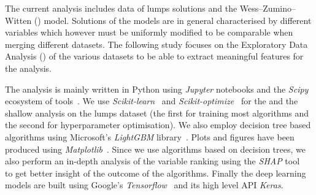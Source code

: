 The current analysis includes data of lumps solutions and the Wess--Zumino--Witten (\wzw)  model.
Solutions of the models are in general characterised by different variables which however must be uniformly modified to be comparable when merging different datasets.
The following study focuses on the Exploratory Data Analysis (\eda) of the various datasets to be able to extract meaningful features for the \ml analysis.

The analysis is mainly written in Python using \emph{Jupyter} notebooks and the \emph{Scipy} ecosystem of tools~\Cite{Virtanen:2020:SciPyFundamentalAlgorithms}.
We use \emph{Scikit-learn}~\Cite{Pedregosa:2011:ScikitlearnMachineLearning} and \emph{Scikit-optimize}~\Cite{Head:2018:ScikitoptimizeScikitoptimizeV0} for the \eda and the shallow \ml analysis on the lumps dataset (the first for training most algorithms and the second for hyperparameter optimisation).
We also employ decision tree based algorithms using Microsoft's \emph{LightGBM} library~\Cite{Ke:2017:LightGBMHighlyEfficient}.
Plots and figures have been produced using \emph{Matplotlib}~\Cite{Hunter:2007:Matplotlib2DGraphics}.
Since we use algorithms based on decision trees, we also perform an in-depth analysis of the variable ranking using the \emph{SHAP} tool~\Cite{Lundberg:2020:LocalExplanationsGlobal} to get better insight of the outcome of the algorithms.
Finally the deep learning models are built using Google's \emph{Tensorflow}~\Cite{Abadi:2015:TensorFlowLargescaleMachine} and its high level API \emph{Keras}.

